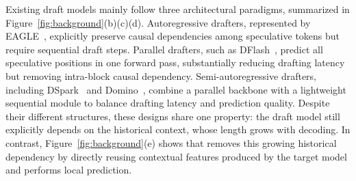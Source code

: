Existing draft models mainly follow three architectural paradigms, summarized in Figure~\ref{fig:background}(b)(c)(d). Autoregressive drafters, represented by EAGLE~\cite{li2026eagle3}, explicitly preserve causal dependencies among speculative tokens but require sequential draft steps. Parallel drafters, such as DFlash~\cite{chen2026dflash}, predict all speculative positions in one forward pass, substantially reducing drafting latency but removing intra-block causal dependency. Semi-autoregressive drafters, including DSpark~\cite{cheng2026dspark} and Domino~\cite{huang2026domino}, combine a parallel backbone with a lightweight sequential module to balance drafting latency and prediction quality. Despite their different structures, these designs share one property: the draft model still explicitly depends on the historical context, whose length grows with decoding. In contrast, Figure~\ref{fig:background}(e) shows that \we removes this growing historical dependency by directly reusing contextual features produced by the target model and performs local prediction.



